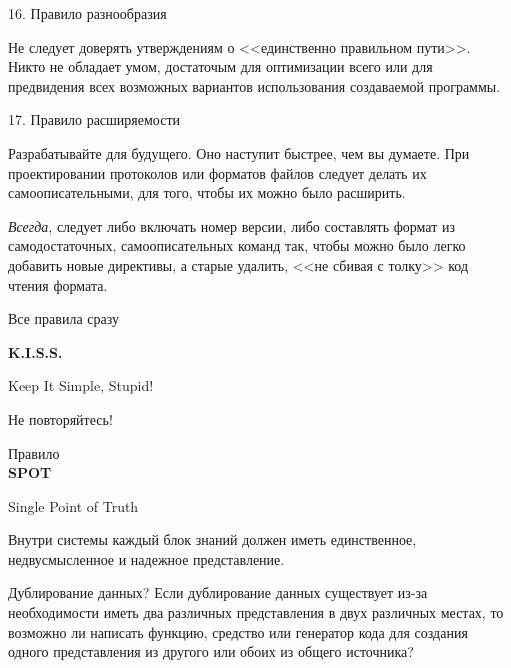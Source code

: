 \begin{frame}{16. Правило разнообразия}
	\begin{block}{Не следует доверять утверждениям о <<единственно правильном пути>>.}
		\pause
		Никто не обладает умом,  достаточым для оптимизации всего или для предвидения всех возможных вариантов использования создаваемой программы.
	\end{block}
\end{frame}

\begin{frame}{17. Правило расширяемости}
	\begin{block}{Разрабатывайте для будущего. Оно наступит быстрее,  чем вы думаете.}
		\pause
		При проектировании протоколов или форматов файлов следует делать их самоописательными,  для того,  чтобы их можно было расширить.
	\end{block}
	\pause
	{\itshape Всегда},  следует либо включать номер версии,  либо составлять формат из самодостаточных,  
	самоописательных команд так,  чтобы можно было легко добавить новые директивы,  
	а старые удалить, <<не сбивая с толку>> код чтения формата.
\end{frame}

\begin{frame}{Все правила сразу}
	\begin{center}
	{\Huge\bfseries K.I.S.S.}

	\pause
	Keep It Simple,  Stupid!
	\end{center}
\end{frame}


\begin{frame}{Не повторяйтесь!}
	\begin{center}
	Правило\\
	{\Huge\bfseries SPOT}

	Single Point of Truth

	\end{center}
	\pause
	
	Внутри системы каждый блок знаний должен иметь единственное,  недвусмысленное и надежное представление.
\end{frame}

\begin{frame}{Дублирование данных?}
	Если дублирование данных существует из-за необходимости иметь два различных представления в 
	двух различных местах,  то возможно ли написать функцию,  средство или генератор кода для 
	создания одного представления из другого или обоих из общего источника?
\end{frame}


